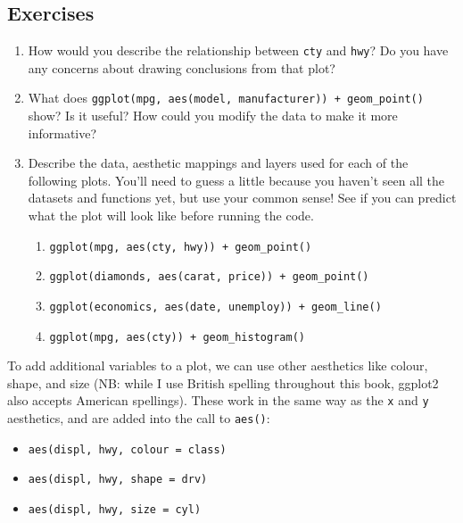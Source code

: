 \subsection{Exercises}

\begin{enumerate}
\def\labelenumi{\arabic{enumi}.}
\item
  How would you describe the relationship between \texttt{cty} and
  \texttt{hwy}? Do you have any concerns about drawing conclusions from
  that plot?
\item
  What does
  \texttt{ggplot(mpg,\ aes(model,\ manufacturer))\ +\ geom\_point()}
  show? Is it useful? How could you modify the data to make it more
  informative?
\item
  Describe the data, aesthetic mappings and layers used for each of the
  following plots. You'll need to guess a little because you haven't
  seen all the datasets and functions yet, but use your common sense!
  See if you can predict what the plot will look like before running the
  code.

  \begin{enumerate}
  \def\labelenumii{\arabic{enumii}.}
  \tightlist
  \item
    \texttt{ggplot(mpg,\ aes(cty,\ hwy))\ +\ geom\_point()}
  \item
    \texttt{ggplot(diamonds,\ aes(carat,\ price))\ +\ geom\_point()}
  \item
    \texttt{ggplot(economics,\ aes(date,\ unemploy))\ +\ geom\_line()}
  \item
    \texttt{ggplot(mpg,\ aes(cty))\ +\ geom\_histogram()}
  \end{enumerate}
\end{enumerate}


To add additional variables to a plot, we can use other aesthetics like
colour, shape, and size (NB: while I use British spelling throughout
this book, ggplot2 also accepts American spellings). These work in the
same way as the \texttt{x} and \texttt{y} aesthetics, and are added into
the call to \texttt{aes()}:  

\begin{itemize}
\tightlist
\item
  \texttt{aes(displ,\ hwy,\ colour\ =\ class)}
\item
  \texttt{aes(displ,\ hwy,\ shape\ =\ drv)}
\item
  \texttt{aes(displ,\ hwy,\ size\ =\ cyl)}
\end{itemize}

